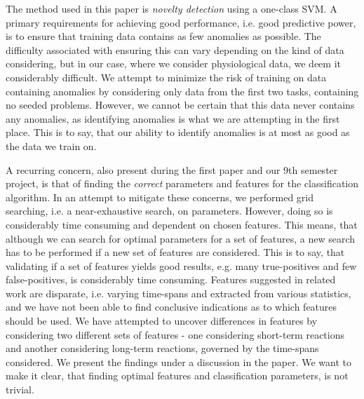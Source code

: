The method used in this paper is \textit{novelty detection} using a one-class SVM. A primary requirements for
achieving good performance, i.e. good predictive power, is to ensure that training data contains as few anomalies as
possible. The difficulty associated with ensuring this can vary depending on the kind of data considering, but in our
case, where we consider physiological data, we deem it considerably difficult. We attempt to minimize the risk of
training on data containing anomalies by considering only data from the first two tasks, containing no seeded
problems. However, we cannot be certain that this data never contains any anomalies, as identifying anomalies is what we
are attempting in the first place. This is to say, that our ability to identify anomalies is at most as good as the data
we train on.

A recurring concern, also present during the first paper and our 9th semester project, is that of finding the
\textit{correct} parameters and features for the classification algorithm. In an attempt to mitigate these concerns, we
performed grid searching, i.e. a near-exhaustive search, on parameters. However, doing so is considerably time consuming
and dependent on chosen features. This means, that although we can search for optimal parameters for a set of features,
a new search has to be performed if a new set of features are considered. This is to say, that validating if a set of
features yields good results, e.g. many true-positives and few false-positives, is considerably time consuming. Features
suggested in related work are disparate, i.e. varying time-spans and extracted from various statistics, and we have not
been able to find conclusive indications as to which features should be used. We have attempted to uncover differences
in features by considering two different sets of features - one considering short-term reactions and another considering
long-term reactions, governed by the time-spans considered. We present the findings under a discussion in the paper. We
want to make it clear, that finding optimal features and classification parameters, is not trivial.


